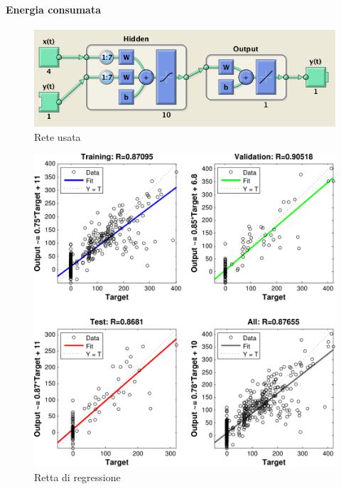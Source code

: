 \paragraph{Energia consumata}
\begin{figure}[htbp]
  \centering
  \includegraphics[scale=0.5]{images/timeseries/energia/net.png}
  \caption{Rete usata}
\end{figure}

\begin{figure}[htbp]
  \centering
  \includegraphics[scale=0.5]{images/timeseries/energia/regressions.pdf}
  \caption{Retta di regressione}
\end{figure}

